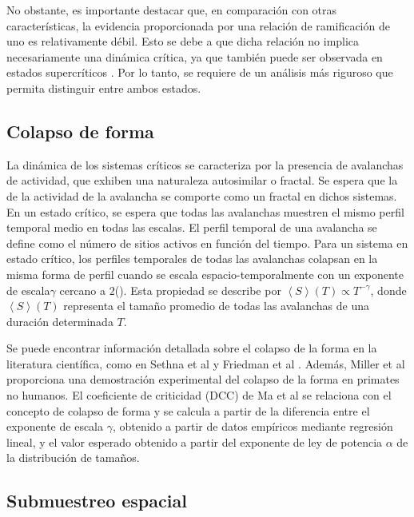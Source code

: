 No obstante, es importante destacar que, en comparación con otras características, la evidencia proporcionada por una relación de ramificación de uno es relativamente débil. Esto se debe a que dicha relación no implica necesariamente una dinámica crítica, ya que también puede ser observada en estados supercríticos \cite{hesse_self-organized_2014}. Por lo tanto, se requiere de un análisis más riguroso que permita distinguir entre ambos estados.


\subsection{Colapso de forma}


La dinámica de los sistemas críticos se caracteriza por la presencia de avalanchas de actividad, que exhiben una naturaleza autosimilar o fractal. Se espera que la  de la actividad de la avalancha se comporte como un fractal en dichos sistemas. En un estado crítico, se espera que todas las avalanchas muestren el mismo perfil temporal medio en todas las escalas. El perfil temporal de una avalancha se define como el número de sitios activos en función del tiempo. Para un sistema en estado crítico, los perfiles temporales de todas las avalanchas colapsan en la misma forma de perfil cuando se escala espacio-temporalmente con un exponente de escala$\gamma$ cercano a $2$(). Esta propiedad se describe por  $ \left\langle S\right\rangle(T) \propto T^{-\gamma}$, donde $\left\langle S\right\rangle(T)$  representa el tamaño promedio de todas las avalanchas de una duración determinada $T$.

Se puede encontrar información detallada sobre el colapso de la forma en la literatura científica, como en Sethna et al \cite{sethna_crackling_2001} y Friedman et al \cite{friedman_universal_2012}. Además, Miller et al \cite{miller_scale-invariant_2019} proporciona una demostración experimental del colapso de la forma en primates no humanos. El coeficiente de criticidad (DCC) de Ma et al \cite{ma_cortical_2019} se relaciona con el concepto de colapso de forma y se calcula a partir de la diferencia entre el exponente de escala $\gamma$, obtenido a partir de datos empíricos mediante regresión lineal, y el valor esperado obtenido a partir del exponente de ley de potencia $\alpha$ de la distribución de tamaños.


\subsection{Submuestreo espacial}


